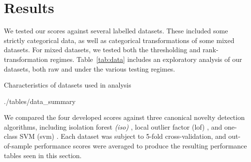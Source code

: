 
\section{Results}
We tested our scores against several labelled datasets.  These included some strictly
    categorical data, as well as categorical transformations of some mixed datasets.
    For mixed datasets, we tested both the thresholding and rank-transformation regimes. 
    Table~\ref{tab:data} includes an exploratory analysis of our datasets, both raw and
    under the various testing regimes.

\begin{table}[ht]
    \centering
    \caption{Characteristics of datasets used in analysis\label{tab:data}}
    \bigskip
     {./tables/data_summary}
\end{table}

We compared the four developed scores against three canonical novelty detection algorithms,
    including isolation forest \emph{(iso)} \cite{liu2000}, local outlier factor (lof) \cite{breunig2000},
    and one-class SVM (svm) \cite{chang2011}.  Each dataset was subject to 5-fold 
    cross-validation, and out-of-sample performance scores were averaged to produce the
    resulting performance tables seen in this section.

